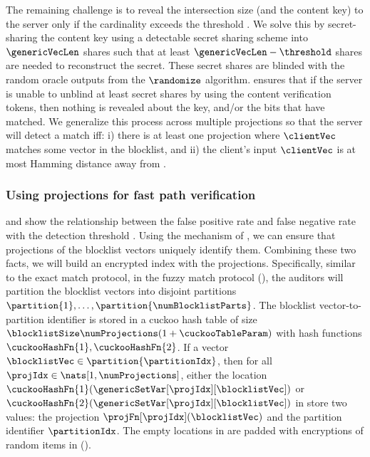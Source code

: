 The remaining challenge is to reveal the intersection 
size (and the content key) to the server only if the cardinality exceeds the threshold \threshold. We solve this by secret-sharing the content key using a detectable secret sharing scheme \dssProtocol into $\genericVecLen$ shares such that at least $\genericVecLen - \threshold$ shares are needed to reconstruct the secret. These secret shares are blinded with the random oracle outputs from the $\randomize$ algorithm. \dssProtocol ensures that if the server is unable to unblind at least \threshold secret shares by using the content verification tokens, then nothing is revealed about the key, and/or the bits that have matched. We generalize this process across multiple projections so that the server will detect a match iff: i) there is at least one projection where $\clientVec$ matches some vector \blocklistVec in the blocklist, and ii) the client's input $\clientVec$ is at most \threshold Hamming distance away from \blocklistVec. 



\subsubsection{Using projections for fast path verification}
%
 and  show the relationship between the false positive rate and false negative rate with the detection threshold \detectionThreshold. Using the mechanism of \cite{chongchitmate2024approximate}, we can ensure that projections of the blocklist vectors uniquely identify them. Combining these two facts, we will build an encrypted index with the projections. Specifically, similar to the exact match protocol, in the fuzzy match protocol (), the auditors will partition the blocklist vectors into \numBlocklistParts disjoint partitions $\partition{1}, \dots, \partition{\numBlocklistParts}$. The blocklist vector-to-partition identifier is stored in a cuckoo hash table \cuckooTable of size $\blocklistSize \numProjections(1+\cuckooTableParam)$ with hash functions $\cuckooHashFn{1}, \cuckooHashFn{2}$. If a vector $\blocklistVec \in \partition{\partitionIdx}$, then for all $\projIdx \in \nats[1, \numProjections]$, either the location $\cuckooHashFn{1}(\genericSetVar[\projIdx][\blocklistVec])$ or $\cuckooHashFn{2}(\genericSetVar[\projIdx][\blocklistVec])$ in \cuckooTable store two values: the projection $\projFn[\projIdx](\blocklistVec)$ and the partition identifier $\partitionIdx$. The empty locations in \cuckooTable are padded with encryptions of random items in \group (). 


